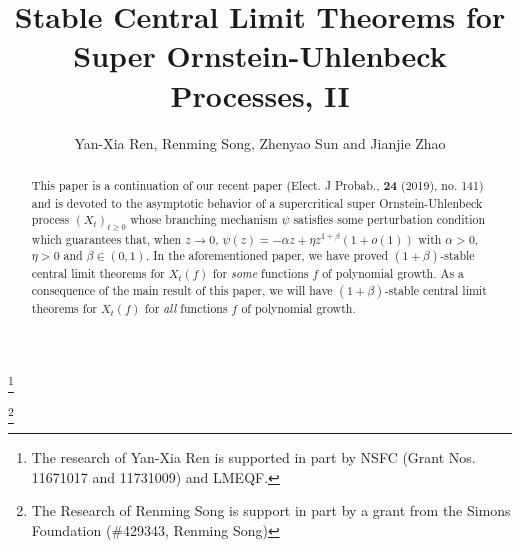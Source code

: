 \documentclass[12pt,a4paper]{amsart}
\theoremstyle{plain}
\theoremstyle{definition}
\numberwithin{equation}{section}
\begin{document}
\title
[stable CLT for super-OU processes]
{Stable Central Limit Theorems for Super Ornstein-Uhlenbeck Processes, II}
\author
[Y.-X. Ren, R. Song, Z. Sun and J. Zhao]
{Yan-Xia Ren, Renming Song, Zhenyao Sun and Jianjie Zhao}
\address{
  Yan-Xia Ren \\
  LMAM School of Mathematical Sciences \& Center for Statistical Science \\
  Peking University \\
  Beijing, P. R. China, 100871}
\thanks{The research of Yan-Xia Ren is supported in part by NSFC (Grant Nos. 11671017  and 11731009) and LMEQF.}
\address{
  Renming Song \\
  Department of Mathematics \\
  University of Illinois at Urbana-Champaign \\
  Urbana, IL, USA, 61801}
\thanks{The Research of Renming Song is support in part by a grant from the Simons Foundation (\#429343, Renming Song)}
\address{
  Zhenyao Sun \\
  School of Mathematics and Statistics\\
  Wuhan University \\
  Hubei, P. R. China, 100871}
\address{
  Jianjie Zhao \\
  School of Mathematical Sciences \\
  Peking University \\
  Beijing, P. R. China, 100871}

\begin{abstract}
This paper is a continuation of our recent paper (Elect. J Probab., \textbf{24} (2019), no. 141)
and is devoted to the  asymptotic behavior of a supercritical super Ornstein-Uhlenbeck process $(X_t)_{t\geq 0}$
 whose branching mechanism $\psi$ satisfies some perturbation condition which guarantees that,
 when $z\to 0$, $\psi(z)=-\alpha z + \eta z^{1+\beta} (1+o(1))$ with $\alpha > 0$, $\eta>0$ and $\beta\in (0, 1)$.
In the aforementioned paper, we have proved $(1+\beta)$-stable central limit theorems
for  $X_t(f) $ for {\it some} functions $f$ of polynomial growth.
As a consequence of the main result of this paper, we will have
$(1+\beta)$-stable central limit theorems for  $X_t(f) $ for {\it all} functions $f$ of polynomial growth.
\end{abstract}
\maketitle
\end{document}
